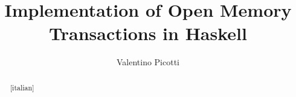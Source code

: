 \documentclass{thesis}
\title{Implementation of Open Memory Transactions in Haskell}
\author{Valentino Picotti}
\begin{document}
\maketitle

\begin{dedication}

\end{dedication}

\begin{abstract}[italian]

\end{abstract}

\begin{abstract}

\end{abstract}

\begin{acknowledgements}[italian]

\end{acknowledgements}

\tableofcontents

\mainmatter






\backmatter

\printindex
\end{document}
